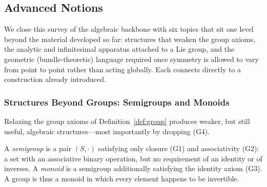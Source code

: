 \documentclass[mathematics,review,submit,moreauthors]{Definitions/mdpi}
\begin{document}

\subsection{Advanced Notions}
\label{sec:advanced-notions}

We close this survey of the algebraic backbone with six topics that sit one
level beyond the material developed so far: structures that weaken the group
axioms, the analytic and infinitesimal apparatus attached to a Lie group,
and the geometric (bundle-theoretic) language required once symmetry is
allowed to vary from point to point rather than acting globally. Each
connects directly to a construction already introduced.

\subsubsection{Structures Beyond Groups: Semigroups and Monoids}
\label{subsec:beyond-groups}

Relaxing the group axioms of Definition~\ref{def:group} produces weaker, but
still useful, algebraic structures---most importantly by dropping (G4).

\begin{Definition}
\label{def:semigroup-monoid}
A \emph{semigroup} is a pair $(S,\cdot)$ satisfying only closure (G1) and
associativity (G2): a set with an associative binary operation, but no
requirement of an identity or of inverses. A \emph{monoid} is a semigroup
additionally satisfying the identity axiom (G3). A group is thus a monoid in
which every element happens to be invertible.
\end{Definition}
\end{document}

